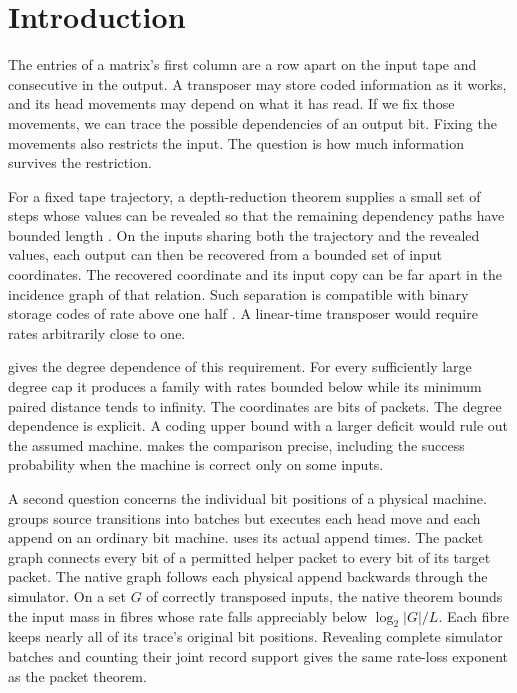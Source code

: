 \section{Introduction}\label{sec:introduction}

The entries of a matrix's first column are a row apart on the input tape
and consecutive in the output. A transposer may store coded information
as it works, and its head movements may depend on what it has read. If
we fix those movements, we can trace the possible dependencies of an
output bit. Fixing the movements also restricts the input. The question
is how much information survives the restriction.

For a fixed tape trajectory, a depth-reduction theorem supplies a small
set of steps whose values can be revealed so that the remaining
dependency paths have bounded length \cite[Corollary~O]{PaperFourteen}.
On the inputs sharing both the trajectory and the revealed values, each
output can then be recovered from a bounded set of input coordinates.
The recovered coordinate and its input copy can be far apart in the
incidence graph of that relation. Such separation is compatible with
binary storage codes of rate above one half
\cite[Corollary~A$'$]{PaperThirteen}. A linear-time transposer would
require rates arbitrarily close to one.

 gives the degree dependence of this requirement. For
every sufficiently large degree cap it produces a family with rates
bounded below while its minimum paired distance tends to infinity. The
coordinates are bits of packets. The degree dependence is explicit. A coding upper bound with a larger deficit would
rule out the assumed machine.  makes the comparison precise,
including the success probability when the machine is correct only on
some inputs.

A second question concerns the individual bit positions of a physical
machine.  groups source transitions into batches but
executes each head move and each append on an ordinary bit machine.
 uses its actual append times. The packet graph connects every bit of a permitted helper packet to
every bit of its target packet. The native graph follows each physical
append backwards through the simulator. On a set $G$ of correctly
transposed inputs, the native theorem bounds the input mass in fibres
whose rate falls appreciably below $\log_2|G|/L$. Each fibre keeps nearly
all of its trace's original bit positions. Revealing complete simulator batches and counting their joint record
support gives the same rate-loss exponent as the packet theorem.

